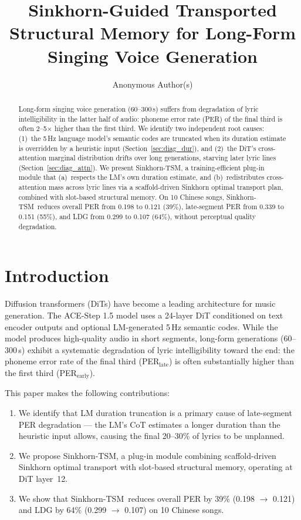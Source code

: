 \documentclass[11pt,a4paper]{article}
\title{\vspace{-1cm}
Sinkhorn-Guided Transported Structural Memory for Long-Form Singing Voice Generation
\vspace{-0.5cm}}
\author{Anonymous Author(s)}
\date{}
\newcommand{\method}{Sinkhorn-TSM}
\begin{document}
\maketitle

\begin{abstract}
Long-form singing voice generation (60--300\,s) suffers from degradation of lyric intelligibility in the latter half of audio: phoneme error rate (PER) of the final third is often 2--5$\times$ higher than the first third. We identify two independent root causes: (1)~the 5\,Hz language model's semantic codes are truncated when its duration estimate is overridden by a heuristic input (Section~\ref{sec:diag_dur}), and (2)~the DiT's cross-attention marginal distribution drifts over long generations, starving later lyric lines (Section~\ref{sec:diag_attn}). We present \method, a training-efficient plug-in module that (a)~respects the LM's own duration estimate, and (b)~redistributes cross-attention mass across lyric lines via a scaffold-driven Sinkhorn optimal transport plan, combined with slot-based structural memory. On 10 Chinese songs, \method~reduces overall PER from 0.198 to 0.121 (39\%), late-segment PER from 0.339 to 0.151 (55\%), and LDG from 0.299 to 0.107 (64\%), without perceptual quality degradation.
\end{abstract}

\section{Introduction}
\label{sec:intro}

Diffusion transformers (DiTs) have become a leading architecture for music generation. The ACE-Step 1.5 model uses a 24-layer DiT conditioned on text encoder outputs and optional LM-generated 5\,Hz semantic codes. While the model produces high-quality audio in short segments, long-form generations (60--300\,s) exhibit a systematic degradation of lyric intelligibility toward the end: the phoneme error rate of the final third (PER$_{\text{late}}$) is often substantially higher than the first third (PER$_{\text{early}}$).

This paper makes the following contributions:
\begin{enumerate}
    \item We identify that LM duration truncation is a primary cause of late-segment PER degradation --- the LM's CoT estimates a longer duration than the heuristic input allows, causing the final 20--30\% of lyrics to be unplanned.
    \item We propose \method, a plug-in module combining scaffold-driven Sinkhorn optimal transport with slot-based structural memory, operating at DiT layer~12.
    \item We show that \method~reduces overall PER by 39\% (0.198 $\to$ 0.121) and LDG by 64\% (0.299 $\to$ 0.107) on 10 Chinese songs.
\end{enumerate}
\end{document}
